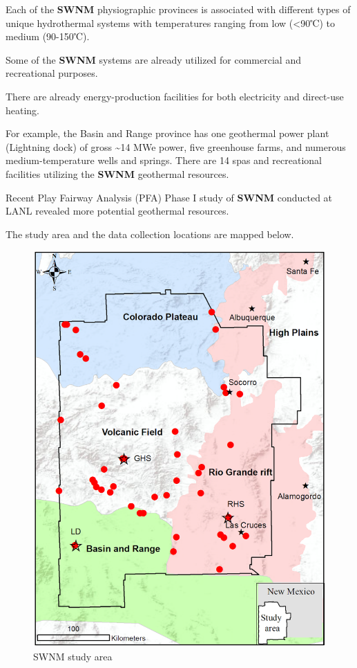 \documentclass[11pt]{article}
\begin{document}
Each of the \textbf{SWNM} physiographic provinces is associated with
different types of unique hydrothermal systems with temperatures ranging
from low (\textless90℃) to medium (90-150℃).

Some of the \textbf{SWNM} systems are already utilized for commercial
and recreational purposes.

There are already energy-production facilities for both electricity and
direct-use heating.

For example, the Basin and Range province has one geothermal power plant
(Lightning dock) of gross \textasciitilde14 MWe power, five greenhouse
farms, and numerous medium-temperature wells and springs. There are 14
spas and recreational facilities utilizing the \textbf{SWNM} geothermal
resources.

Recent Play Fairway Analysis (PFA) Phase I study of \textbf{SWNM}
conducted at LANL revealed more potential geothermal resources.

The study area and the data collection locations are mapped below.

\begin{figure}
\centering
\includegraphics{../map/SWNM_study_area.png}
\caption{SWNM study area}
\end{figure}
\end{document}
